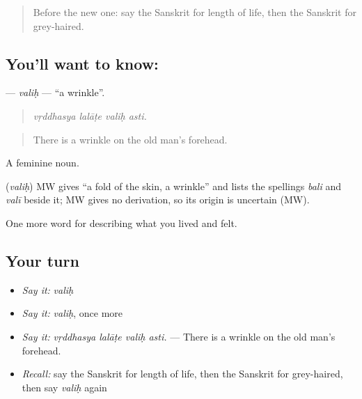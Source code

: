 \begin{quote}
Before the new one: say the Sanskrit for length of life, then the Sanskrit for grey-haired.
\end{quote}

\subsection*{You'll want to know: }
\textbf{} — \emph{valiḥ} — \textquotedblleft{}a wrinkle\textquotedblright{}.

\begin{quote}
   
\end{quote}

\begin{quote}
\emph{vṛddhasya lalāṭe valiḥ asti.}
\end{quote}

\begin{quote}
There is a wrinkle on the old man's forehead.
\end{quote}

A feminine noun.

\begin{cousinweb}
\textbf{} (\emph{valiḥ}) MW gives \textquotedblleft{}a fold of the skin, a wrinkle\textquotedblright{} and lists the spellings \emph{bali} and \emph{valī} beside it; MW gives no derivation, so its origin is uncertain (MW).
\end{cousinweb}

\begin{grammarlens}[title={What you've built}]
One more word for describing what you lived and felt.
\end{grammarlens}

\subsection*{Your turn}
\begin{itemize}
\raggedright
  \item \emph{Say it:} \emph{valiḥ}
  \item \emph{Say it:} \emph{valiḥ}, once more
  \item \emph{Say it:} \emph{vṛddhasya lalāṭe valiḥ asti.} — There is a wrinkle on the old man's forehead.
  \item \emph{Recall:} say the Sanskrit for length of life, then the Sanskrit for grey-haired, then say \emph{valiḥ} again
\end{itemize}

